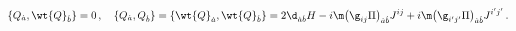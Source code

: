 \begin{equation}
\{Q_{\dot{a}},\wt{Q}_{\dot{b}}\}=0\,,\quad
\{Q_{\dot{a}},Q_{\dot{b}}\}=\{\wt{Q}_{\dot{a}},\wt{Q}_{\dot{b}}\}
=2\d_{\dot{a}\dot{b}}H-i\m\bigl(\g_{ij}\Pi\bigr)_{\dot{a}\dot{b}}J^{ij}+i\m\bigl(\g_{i'j'}\Pi\bigr)_{\dot{a}\dot{b}}J^{i'j'}\,.
\end{equation}

